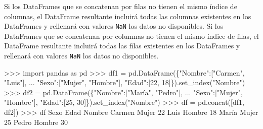 \documentclass[
  spanish,
  a4paper,
]{scrreport}
\newenvironment{Shaded}{\begin{snugshade}}{\end{snugshade}}
\newcommand{\DecValTok}[1]{\textcolor[rgb]{0.68,0.00,0.00}{#1}}
\newcommand{\ImportTok}[1]{\textcolor[rgb]{0.00,0.46,0.62}{#1}}
\newcommand{\NormalTok}[1]{\textcolor[rgb]{0.00,0.23,0.31}{#1}}
\newcommand{\OperatorTok}[1]{\textcolor[rgb]{0.37,0.37,0.37}{#1}}
\newcommand{\StringTok}[1]{\textcolor[rgb]{0.13,0.47,0.30}{#1}}
\begin{document}
\begin{tcolorbox}[enhanced jigsaw, arc=.35mm, bottomrule=.15mm, bottomtitle=1mm, breakable, colback=white, colbacktitle=quarto-callout-warning-color!10!white, colframe=quarto-callout-warning-color-frame, coltitle=black, left=2mm, leftrule=.75mm, opacityback=0, opacitybacktitle=0.6, rightrule=.15mm, title=\textcolor{quarto-callout-warning-color}{\faExclamationTriangle}\hspace{0.5em}{Advertencia}, titlerule=0mm, toprule=.15mm, toptitle=1mm]

Si los DataFrames que se concatenan por filas no tienen el mismo índice
de columnas, el DataFrame resultante incluirá todas las columnas
existentes en los DataFrames y rellenará con valores \texttt{NaN} los
datos no disponibles. Si los DataFrames que se concatenan por columnas
no tienen el mismo índice de filas, el DataFrame resultante incluirá
todas las filas existentes en los DataFrames y rellenará con valores
\texttt{NaN} los datos no disponibles.

\end{tcolorbox}

\begin{Shaded}
\begin{Highlighting}[]
\OperatorTok{\textgreater{}\textgreater{}\textgreater{}} \ImportTok{import}\NormalTok{ pandas }\ImportTok{as}\NormalTok{ pd}
\OperatorTok{\textgreater{}\textgreater{}\textgreater{}}\NormalTok{ df1 }\OperatorTok{=}\NormalTok{ pd.DataFrame(\{}\StringTok{"Nombre"}\NormalTok{:[}\StringTok{"Carmen"}\NormalTok{, }\StringTok{"Luis"}\NormalTok{], }
\NormalTok{... }\StringTok{"Sexo"}\NormalTok{:[}\StringTok{"Mujer"}\NormalTok{, }\StringTok{"Hombre"}\NormalTok{], }\StringTok{"Edad"}\NormalTok{:[}\DecValTok{22}\NormalTok{, }\DecValTok{18}\NormalTok{]\}).set\_index(}\StringTok{"Nombre"}\NormalTok{)}
\OperatorTok{\textgreater{}\textgreater{}\textgreater{}}\NormalTok{ df2 }\OperatorTok{=}\NormalTok{ pd.DataFrame(\{}\StringTok{"Nombre"}\NormalTok{:[}\StringTok{"María"}\NormalTok{, }\StringTok{"Pedro"}\NormalTok{], }
\NormalTok{... }\StringTok{"Sexo"}\NormalTok{:[}\StringTok{"Mujer"}\NormalTok{, }\StringTok{"Hombre"}\NormalTok{], }\StringTok{"Edad"}\NormalTok{:[}\DecValTok{25}\NormalTok{, }\DecValTok{30}\NormalTok{]\}).set\_index(}\StringTok{"Nombre"}\NormalTok{)}
\OperatorTok{\textgreater{}\textgreater{}\textgreater{}}\NormalTok{ df }\OperatorTok{=}\NormalTok{ pd.concat([df1, df2])}
\OperatorTok{\textgreater{}\textgreater{}\textgreater{}}\NormalTok{ df}
\NormalTok{          Sexo  Edad}
\NormalTok{Nombre              }
\NormalTok{Carmen   Mujer    }\DecValTok{22}
\NormalTok{Luis    Hombre    }\DecValTok{18}
\NormalTok{María    Mujer    }\DecValTok{25}
\NormalTok{Pedro   Hombre    }\DecValTok{30}
\end{Highlighting}
\end{Shaded}
\end{document}

